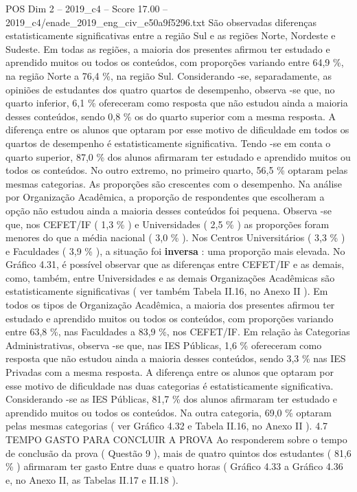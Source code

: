 \begin{textsample}{POS Dim 2 – 2019\_c4 – Score 17.00 – 2019\_c4/enade\_2019\_eng\_civ\_e50a9f5296.txt}
São observadas diferenças estatisticamente significativas entre a região Sul e as regiões Norte, Nordeste e Sudeste.
Em todas as regiões, a maioria dos presentes afirmou ter estudado e aprendido muitos ou todos os conteúdos, com proporções variando entre 64,9 \%, na região Norte a 76,4 \%, na região Sul.
Considerando -se, separadamente, as opiniões de estudantes dos quatro quartos de desempenho, observa -se que, no quarto inferior, 6,1 \% ofereceram como resposta que não estudou ainda a maioria desses conteúdos, sendo 0,8 \% os do quarto superior com a mesma resposta.
A diferença entre os alunos que optaram por esse motivo de dificuldade em todos os quartos de desempenho é estatisticamente significativa.
Tendo -se em conta o quarto superior, 87,0 \% dos alunos afirmaram ter estudado e aprendido muitos ou todos os conteúdos.
No outro extremo, no primeiro quarto, 56,5 \% optaram pelas mesmas categorias.
As proporções são crescentes com o desempenho.
Na análise por Organização Acadêmica, a proporção de respondentes que escolheram a opção não estudou ainda a maioria desses conteúdos foi pequena.
Observa -se que, nos CEFET/IF ( 1,3 \% ) e Universidades ( 2,5 \% ) as proporções foram menores do que a média nacional ( 3,0 \% ).
Nos Centros Universitários ( 3,3 \% ) e Faculdades ( 3,9 \% ), a situação foi \textbf{inversa} : uma proporção mais elevada.
No Gráfico 4.31, é possível observar que as diferenças entre CEFET/IF e as demais, como, também, entre Universidades e as demais Organizações Acadêmicas são estatisticamente significativas ( ver também Tabela II.16, no Anexo II ).
Em todos os tipos de Organização Acadêmica, a maioria dos presentes afirmou ter estudado e aprendido muitos ou todos os conteúdos, com proporções variando entre 63,8 \%, nas Faculdades a 83,9 \%, nos CEFET/IF.
Em relação às Categorias Administrativas, observa -se que, nas IES Públicas, 1,6 \% ofereceram como resposta que não estudou ainda a maioria desses conteúdos, sendo 3,3 \% nas IES Privadas com a mesma resposta.
A diferença entre os alunos que optaram por esse motivo de dificuldade nas duas categorias é estatisticamente significativa.
Considerando -se as IES Públicas, 81,7 \% dos alunos afirmaram ter estudado e aprendido muitos ou todos os conteúdos.
Na outra categoria, 69,0 \% optaram pelas mesmas categorias ( ver Gráfico 4.32 e Tabela II.16, no Anexo II ). 4.7 TEMPO GASTO PARA CONCLUIR A PROVA Ao responderem sobre o tempo de conclusão da prova ( Questão 9 ), mais de quatro quintos dos estudantes ( 81,6 \% ) afirmaram ter gasto Entre duas e quatro horas ( Gráfico 4.33 a Gráfico 4.36 e, no Anexo II, as Tabelas II.17 e II.18 ).

\end{textsample}

